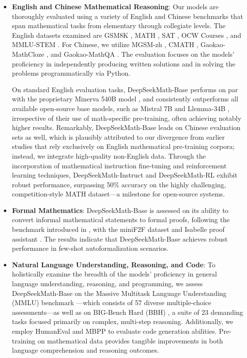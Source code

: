 \begin{itemize}[topsep=0pt]
    \item \textbf{English and Chinese Mathematical Reasoning}: Our models are thoroughly evaluated using a variety of English and Chinese benchmarks that span mathematical tasks from elementary through collegiate levels. The English datasets examined are GSM8K \citep{gsm8k}, MATH \citep{MATH}, SAT \citep{llemma}, OCW Courses \citep{minerva}, and MMLU-STEM \citep{mmlu}. For Chinese, we utilize MGSM-zh \citep{mgsm}, CMATH \citep{wei2023cmath}, Gaokao-MathCloze \citep{agieval}, and Gaokao-MathQA \citep{agieval}. The evaluation focuses on the models' proficiency in independently producing written solutions and in solving the problems programmatically via Python.

On standard English evaluation tasks, DeepSeekMath-Base performs on par with the proprietary Minerva 540B model \citep{minerva}, and consistently outperforms all available open-source base models, such as Mistral 7B \citep{mistral} and Llemma-34B \citep{llemma}, irrespective of their use of math-specific pre-training, often achieving notably higher results. Remarkably, DeepSeekMath-Base leads on Chinese evaluation sets as well, which is plausibly attributed to our divergence from earlier studies \citep{minerva,llemma} that rely exclusively on English mathematical pre-training corpora; instead, we integrate high-quality non-English data. Through the incorporation of mathematical instruction fine-tuning and reinforcement learning techniques, DeepSeekMath-Instruct and DeepSeekMath-RL exhibit robust performance, surpassing 50\% accuracy on the highly challenging, competition-style MATH dataset—a milestone for open-source systems.

\item \textbf{Formal Mathematics}: DeepSeekMath-Base is assessed on its ability to convert informal mathematical statements to formal proofs, following the benchmark introduced in \citep{dsp_proof}, with the miniF2F dataset \citep{minif2f} and Isabelle proof assistant \citep{isabelle}. The results indicate that DeepSeekMath-Base achieves robust performance in few-shot autoformalization scenarios.

\item \textbf{Natural Language Understanding, Reasoning, and Code}: To holistically examine the breadth of the models' proficiency in general language understanding, reasoning, and programming, we assess DeepSeekMath-Base on the Massive Multitask Language Understanding (MMLU) benchmark \citep{mmlu}—which consists of 57 diverse multiple-choice assessments—as well as on BIG-Bench Hard (BBH) \citep{bbh}, a suite of 23 demanding tasks focused primarily on complex, multi-step reasoning. Additionally, we employ HumanEval \citep{codex} and MBPP \citep{mbpp} to evaluate code generation abilities. Pre-training on mathematical data provides tangible improvements in both language comprehension and reasoning outcomes.


\end{itemize}
